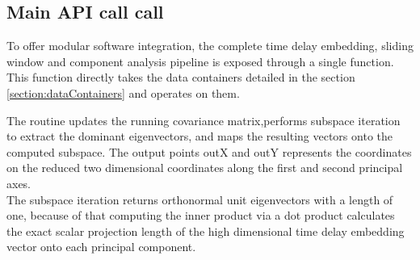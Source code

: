  \subsection{Main API call call}
 To offer modular software integration, the complete time delay embedding, sliding window and component analysis pipeline is exposed through a single function. This function directly takes the data containers detailed in the section \ref{section:dataContainers} and operates on them.
 
The routine updates the running covariance matrix,performs subspace iteration to extract the dominant eigenvectors, and maps the resulting vectors onto the computed subspace. The output points outX and outY represents the coordinates on the reduced two dimensional coordinates along the first and second principal axes.\\
The subspace iteration returns orthonormal unit eigenvectors with a length of one, because of that computing the inner product via a dot product calculates the exact scalar projection length of the high dimensional time delay embedding vector onto each principal component.
